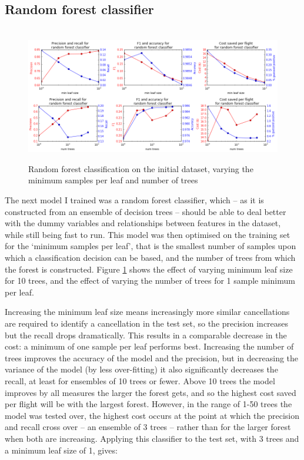 \documentclass[a4paper]{article}
\begin{document}
\subsection*{Random forest classifier}

\begin{figure}[h]
\centering
\hbox{\hspace{-0.5in}
\includegraphics[width=1.15\textwidth]{../figures/classification/rf_reg_leaves.png}}
\caption{Random forest classification on the initial dataset, varying the minimum samples per leaf and number of trees}
\label{randfor}
\end{figure}

The next model I trained was a random forest classifier, which -- as it is constructed from an ensemble of decision trees -- should be able to deal better with the dummy variables and relationships between features in the dataset, while still being fast to run. This model was then optimised on the training set for the `minimum samples per leaf', that is the smallest number of samples upon which a classification decision can be based, and the number of trees from which the forest is constructed. Figure \ref{randfor} shows the effect of varying minimum leaf size for 10 trees, and the effect of varying the number of trees for 1 sample minimum per leaf.

Increasing the minimum leaf size means increasingly more similar cancellations are required to identify a cancellation in the test set, so the precision increases but the recall drops dramatically. This results in a comparable decrease in the cost: a minimum of one sample per leaf performs best. Increasing the number of trees improves the accuracy of the model and the precision, but in decreasing the variance of the model (by less over-fitting) it also significantly decreases the recall, at least for ensembles of 10 trees or fewer. Above 10 trees the model improves by all measures the larger the forest gets, and so the highest cost saved per flight will be with the largest forest. However, in the range of 1-50 trees the model was tested over, the highest cost occurs at the point at which the precision and recall cross over -- an ensemble of 3 trees -- rather than for the larger forest when both are increasing. Applying this classifier to the test set, with 3 trees and a minimum leaf size of 1, gives:
\end{document}
